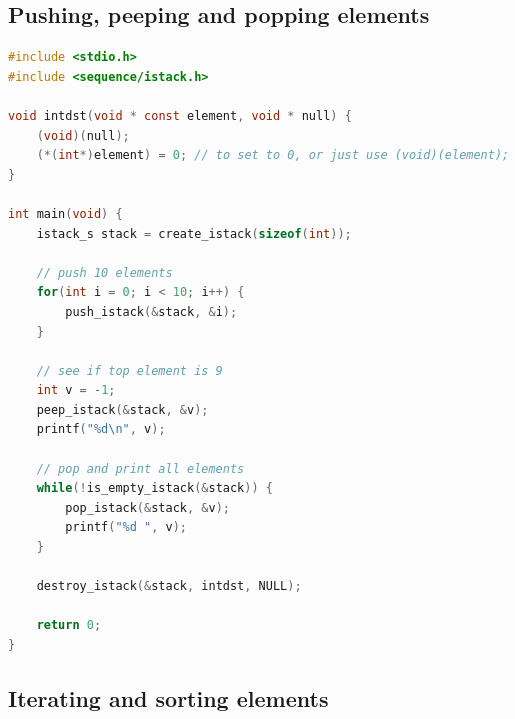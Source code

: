 \subsection{Pushing, peeping and popping elements}

\noindent
\begin{minipage}{\linewidth}
\begin{lstlisting}[language=C, style=CodeEditor, label=lst:each-stack-01]
#include <stdio.h>
#include <sequence/istack.h>

void intdst(void * const element, void * null) {
    (void)(null);
    (*(int*)element) = 0; // to set to 0, or just use (void)(element);
}

int main(void) {
    istack_s stack = create_istack(sizeof(int));

    // push 10 elements
    for(int i = 0; i < 10; i++) {
        push_istack(&stack, &i);
    }

    // see if top element is 9
    int v = -1;
    peep_istack(&stack, &v);
    printf("%d\n", v);

    // pop and print all elements
    while(!is_empty_istack(&stack)) {
        pop_istack(&stack, &v);
        printf("%d ", v);
    }

    destroy_istack(&stack, intdst, NULL);

    return 0;
}
\end{lstlisting}
\end{minipage}

\subsection{Iterating and sorting elements}

